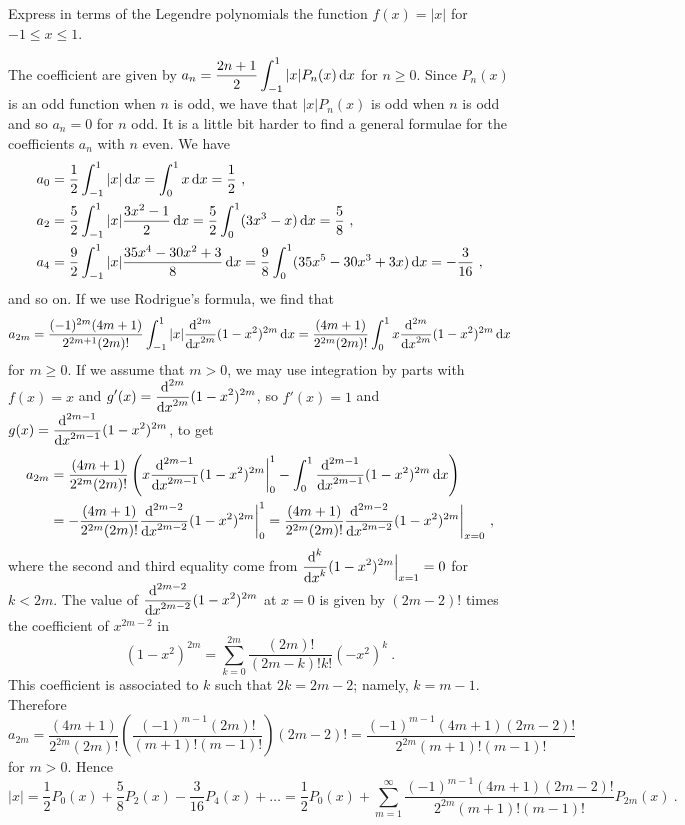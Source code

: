 \begin{egg}
Express in terms of the Legendre polynomials the function
$f(x) = |x|$ for $-1\leq x \leq 1$.

The coefficient are given by
$\displaystyle a_n  =  \frac{2n+1}{2} \int_{-1}^{1} |x| P_n(x)\dx{x}$
for $n \geq 0$.  Since $P_n(x)$ is an odd function when $n$ is odd, we
have that $|x| P_n(x)$ is odd when $n$ is odd and so $a_n =0$ for $n$
odd.  It is a little bit harder to find a general formulae for the
coefficients $a_n$ with $n$ even.  We have
\begin{align*}
a_0 &= \frac{1}{2} \int_{-1}^1 |x| \dx{x} = \int_0^1 x \dx{x} =
\frac{1}{2} \ ,\\
a_2 &= \frac{5}{2} \int_{-1}^1 |x| \frac{3x^2-1}{2} \dx{x} 
= \frac{5}{2} \int_0^1 (3x^3-x) \dx{x} = \frac{5}{8} \ , \\
a_4 &= \frac{9}{2} \int_{-1}^1 |x| \frac{35x^4-30x^2+3}{8} \dx{x}
= \frac{9}{8} \int_0^1 (35x^5-30x^3+3x) \dx{x} = -\frac{3}{16} \ ,
\end{align*}
and so on.  If we use Rodrigue's formula, we find that
\[
a_{2m} = \frac{(-1)^{2m}(4m+1)}{2^{2m+1} (2m)!}
\int_{-1}^{1} |x| \dfdxn{(1-x^2)^{2m}}{x}{2m} \dx{x}
= \frac{(4m+1)}{2^{2m} (2m)!} \int_0^{1} x \dfdxn{(1-x^2)^{2m}}{x}{2m} \dx{x}
\]
for $m \ge 0$.  If we assume that $m>0$, we may use integration by
parts with $f(x) = x$ and
$\displaystyle g'(x) = \dfdxn{(1-x^2)^{2m}}{x}{2m}$, so 
$f'(x) = 1$ and $\displaystyle g(x) = \dfdxn{(1-x^2)^{2m}}{x}{2m-1}$, to
get
\begin{align*}
a_{2m} &= \frac{(4m+1)}{2^{2m} (2m)!}\left(
x \dfdxn{(1-x^2)^{2m}}{x}{2m-1}\bigg|_0^1 
- \int_0^{1} \dfdxn{(1-x^2)^{2m}}{x}{2m-1} \dx{x}\right)\\
&= - \frac{(4m+1)}{2^{2m} (2m)!} \dfdxn{(1-x^2)^{2m}}{x}{2m-2}\bigg|_0^1
= \frac{(4m+1)}{2^{2m} (2m)!} \dfdxn{(1-x^2)^{2m}}{x}{2m-2}\bigg|_{x=0} \ ,
\end{align*}
where the second and third equality come from
$\displaystyle \dfdxn{(1-x^2)^{2m}}{x}{k}\Big|_{x=1} = 0$ for $k<2m$.
The value of $\displaystyle \dfdxn{(1-x^2)^{2m}}{x}{2m-2}$ at $x=0$ is
given by $(2m-2)!$ times the coefficient of $x^{2m-2}$ in
\[
(1-x^2)^{2m} = \sum_{k=0}^{2m} \frac{(2m)!}{(2m-k)!k!} (-x^2)^k \ .
\]
This coefficient is associated to $k$ such that $2k = 2m-2$; namely,
$k=m-1$.  Therefore
\[
a_{2m} = \frac{(4m+1)}{2^{2m} (2m)!}\left(
 \frac{(-1)^{m-1}  (2m)!}{(m+1)!(m-1)!} \right) (2m-2)!
= \frac{(-1)^{m-1} (4m+1) (2m-2)!}{2^{2m}(m+1)!(m-1)!}
\]
for $m>0$.  Hence
\[
|x| = \frac{1}{2}P_0(x) + \frac{5}{8}P_2(x) - \frac{3}{16}P_4(x) + \ldots
= \frac{1}{2}P_0(x) + \sum_{m=1}^\infty
\frac{(-1)^{m-1} (4m+1) (2m-2)!}{2^{2m}(m+1)!(m-1)!} P_{2m}(x) \ .
\]
\end{egg}

